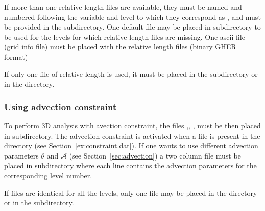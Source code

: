 If more than one relative length files are available, they must be  named and numbered following the variable and level to which they correspond as , and must be provided in the  subdirectory. One default file  may be placed in   subdirectory to be used for the levels for which relative length files are missing. One  ascii file (grid info file) must be placed with the relative length files (binary GHER format)

If only one  file of relative length is used, it must be placed in the  subdirectory or in the  directory.

\begin{center}
\end{center}


\subsubsection{Using advection constraint\label{advconstuse}}

To perform 3D analysis with avection constraint, the files ,\linebreak {}, , must be then placed in  subdirectory. The advection constraint is activated when a  file is present in the  directory (see Section~\ref{ex:constraint.dat}). If one wants to use different advection parameters $\theta$ and $\mathcal{A}$ (see Section~\ref{sec:advection}) a two column  file must be placed in  subdirectory where each line contains the advection parameters for the corresponding level number.

If  files are identical for all the levels, only one file  may be placed in the  directory or in the  subdirectory.

